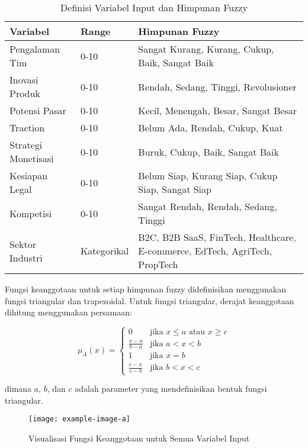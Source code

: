 \documentclass[12pt,a4paper]{article}
\begin{document}
\begin{table}[htbp] %
\centering
\caption{Definisi Variabel Input dan Himpunan Fuzzy}
\label{tab:variables}
\begin{tabular}{@{}lll@{}}
\toprule
\textbf{Variabel} & \textbf{Range} & \textbf{Himpunan Fuzzy} \\
\midrule
Pengalaman Tim & 0-10 & Sangat Kurang, Kurang, Cukup, Baik, Sangat Baik \\
Inovasi Produk & 0-10 & Rendah, Sedang, Tinggi, Revolusioner \\
Potensi Pasar & 0-10 & Kecil, Menengah, Besar, Sangat Besar \\
Traction & 0-10 & Belum Ada, Rendah, Cukup, Kuat \\
Strategi Monetisasi & 0-10 & Buruk, Cukup, Baik, Sangat Baik \\
Kesiapan Legal & 0-10 & Belum Siap, Kurang Siap, Cukup Siap, Sangat Siap \\
Kompetisi & 0-10 & Sangat Rendah, Rendah, Sedang, Tinggi \\
Sektor Industri & Kategorikal & B2C, B2B SaaS, FinTech, Healthcare, E-commerce, EdTech, AgriTech, PropTech \\
\bottomrule
\end{tabular}
\end{table}

Fungsi keanggotaan untuk setiap himpunan fuzzy didefinisikan menggunakan fungsi triangular dan trapezoidal. Untuk fungsi triangular, derajat keanggotaan dihitung menggunakan persamaan:

\begin{equation}
\mu_A(x) = \begin{cases}
0 & \text{jika } x \leq a \text{ atau } x \geq c \\
\frac{x-a}{b-a} & \text{jika } a < x < b \\
1 & \text{jika } x = b \\
\frac{c-x}{c-b} & \text{jika } b < x < c
\end{cases}
\end{equation}

dimana $a$, $b$, dan $c$ adalah parameter yang mendefinisikan bentuk fungsi triangular.

\begin{figure}[htbp] %
    \centering
    \texttt{[image: example-image-a]} %
    \caption{Visualisasi Fungsi Keanggotaan untuk Semua Variabel Input}
    \label{fig:membership}
\end{figure}
\end{document}
